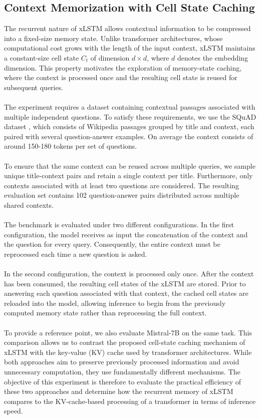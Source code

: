 \subsection{Context Memorization with Cell State Caching}
\label{subsection:speedup}

The recurrent nature of xLSTM allows contextual information to be compressed into a fixed-size memory state. 
Unlike transformer architectures, whose computational cost grows with the length of the input context, xLSTM 
maintains a constant-size cell state $C_t$ of dimension $d \times d$, where $d$ denotes the embedding dimension. 
This property motivates the exploration of memory-state caching, where the context is processed once and the 
resulting cell state is reused for subsequent queries. \\ \\ 
%
The experiment requires a dataset containing contextual passages associated with multiple independent questions.
To satisfy these requirements, we use the SQuAD dataset \cite{rajpurkar-etal-2016-squad}, which consists of Wikipedia 
passages grouped by title and context, each paired with several question-answer examples. On average the context
consists of around 150-180 tokens per set of questions.\\ \\ 
%
To ensure that the same context can be reused across multiple queries, we sample unique title-context pairs and retain
a single context per title. Furthermore, only contexts associated with at least two questions are considered. 
The resulting evaluation set contains 102 question-answer pairs distributed across multiple shared contexts. \\ \\ 
%
The benchmark is evaluated under two different configurations. In the first configuration,
the model receives as input the concatenation of the context and the question for every query. Consequently, the entire context must 
be reprocessed each time a new question is asked. \\ \\
%
In the second configuration, the context is processed only once. After the context has been consumed, 
the resulting cell states of the xLSTM are stored. Prior to answering each question associated with that context, the cached cell states are 
reloaded into the model, allowing inference to begin from the previously computed memory state rather than reprocessing the full context. \\ \\
%
To provide a reference point, we also evaluate Mistral-7B on the same task. This comparison allows us to contrast the proposed 
cell-state caching mechanism of xLSTM with the key-value (KV) cache used by transformer architectures. While both approaches 
aim to preserve previously processed information and avoid unnecessary computation, they use fundamentally different mechanisms. 
The objective of this experiment is therefore to evaluate the practical efficiency of these two approaches and determine how the recurrent 
memory of xLSTM compares to the KV-cache-based processing of a transformer in terms of inference speed.

